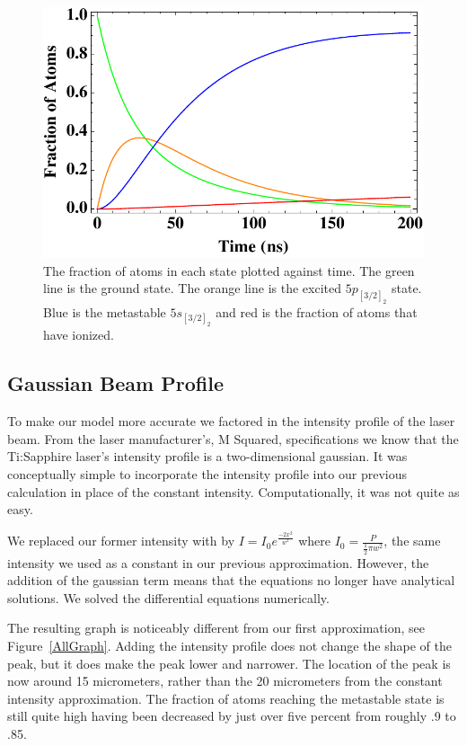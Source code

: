 \documentclass[prb,preprint]{revtex4-1}
\begin{document}
\begin{figure}[h!]
\centering
\includegraphics[width=6in]{TimeGraph.pdf}
\caption{The fraction of atoms in each state plotted against time. The green line is the ground state. The orange line is the excited $5p_{[3/2]_2}$ state. Blue is the metastable $5s_{[3/2]_2}$ and red is the fraction of atoms that have ionized.}
\label{TimeGraph}
\end{figure}

\subsection{Gaussian Beam Profile}

To make our model more accurate we factored in the intensity profile of the laser beam. From the laser manufacturer's, M Squared, specifications we know that the Ti:Sapphire laser's intensity profile is a two-dimensional gaussian. It was conceptually simple to incorporate the intensity profile into our previous calculation in place of the constant intensity. Computationally, it was not quite as easy.

We replaced our former intensity with by $I = I_0 e^{\frac{-2 x^2}{w^2}}$ where $I_0 = \frac{P}{\frac{1}{2}\pi w^2}$, the same intensity we used as a constant in our previous approximation. However, the addition of the gaussian term means that the equations no longer have analytical solutions. We solved the differential equations numerically.

The resulting graph is noticeably different from our first approximation, see Figure~\ref{AllGraph}. Adding the intensity profile does not change the shape of the peak, but it does make the peak lower and narrower. The location of the peak is now around 15 micrometers, rather than the 20 micrometers from the constant intensity approximation.  The fraction of atoms reaching the metastable state is still quite high having been decreased by just over five percent from roughly .9 to .85.
\end{document}
